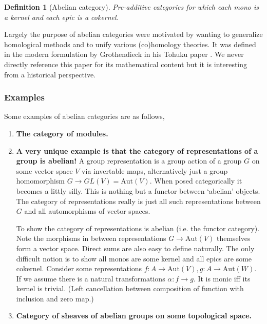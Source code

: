 \documentclass[12pt]{article}
\numberwithin{equation}{section}
\newtheorem{definition}{Definition}[section]
\begin{document}
\begin{appendices}
		
		\begin{definition}[Abelian category]
			Pre-additive categories for which each mono is a kernel and each epic is a cokernel.
		\end{definition}
		Largely the purpose of abelian categories were motivated by wanting to generalize homological methods and to unify various (co)homology theories. It was defined in the modern formulation by Grothendieck in his Tohuku paper \cite{grothendieck1957quelques}. We never directly reference this paper for its mathematical content but it is interesting from a historical perspective.
		\subsubsection{Examples}
		Some examples of abelian categories are as follows,
		\begin{enumerate}
			\item \textbf{The category of modules.}
			\item\textbf{ A very unique example is that the category of representations of a group is abelian!} A group representation is a group action of a group $G$ on some vector space $V$ via invertable maps, alternatively just a group homomorphism $G\to GL(V)=\mathrm{Aut}(V)$. When posed categorically it becomes a littly silly. This is nothing but a functor between `abelian' objects. The category of representations really is just all such representations between $G$ and all automorphisms of vector spaces.
			
			To show the category of representations is abelian (i.e. the functor category). Note the morphisms in between representations $G \to \mathrm{Aut}(V)$ themselves form a vector space. Direct sums are also easy to define naturally. The only difficult notion is to show all monos are some kernel and all epics are some cokernel. Consider some representations $f: A \to \mathrm{Aut}(V), g: A \to \mathrm{Aut}(W)$. If we assume there is a natural transformations $\alpha: f \to g$. It is monic iff its kernel is trivial. (Left cancellation between composition of function with inclusion and zero map.)	
			\item \textbf{Category of sheaves of abelian groups on some topological space.}
			

\end{enumerate}
\end{appendices}
\end{document}
